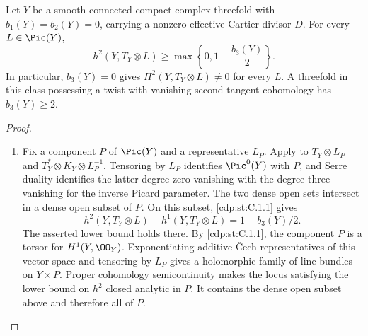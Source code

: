 \begin{proposition}\hypertarget{tag-01BP}{}\label{cdp:st:C.1.3}

Let $Y$ be a smooth connected compact complex threefold with
$b_1(Y)=b_2(Y)=0$, carrying a nonzero effective Cartier divisor $D$.
For every $L\in\Pic(Y)$,
\[
 h^2(Y,T_Y\otimes L)\geq
 \max\left\{0,1-\frac{b_3(Y)}2\right\}.
\]
In particular, $b_3(Y)=0$ gives $H^2(Y,T_Y\otimes L)\ne0$ for
every $L$. A threefold in this class possessing a twist with vanishing
second tangent cohomology has $b_3(Y)\geq2$.
\end{proposition}


\begin{proof}
\begin{enumerate}[label={$\langle1\rangle$\arabic*.},leftmargin=*]
\item 
Fix a component $P$ of $\Pic(Y)$ and a representative $L_P$.
Apply \cite[Corollary~1.3, p.~79]{CDP98} to
$T_Y\otimes L_P$ and $T_Y^*\otimes K_Y\otimes L_P^{-1}$.
Tensoring by $L_P$ identifies $\Pic^0(Y)$ with $P$, and
Serre duality identifies the latter degree-zero vanishing with
the degree-three vanishing for the inverse Picard parameter.
The two dense open sets intersect in a dense open subset of $P$.
On this subset, \cref{cdp:st:C.1.1} gives
\[
 h^2(Y,T_Y\otimes L)-h^1(Y,T_Y\otimes L)
 =1-b_3(Y)/2.
\]
The asserted lower bound holds there. By \cref{cdp:st:C.1.1}, the component $P$ is a torsor for
$H^1(Y,\OO_Y)$. Exponentiating additive \v Cech representatives
of this vector space and tensoring by $L_P$ gives a holomorphic
family of line bundles on $Y\times P$. Proper cohomology
semicontinuity makes the locus satisfying the lower bound on
$h^2$ closed analytic in $P$. It contains the dense open subset
above and therefore all of $P$. 

\end{enumerate}
\end{proof}